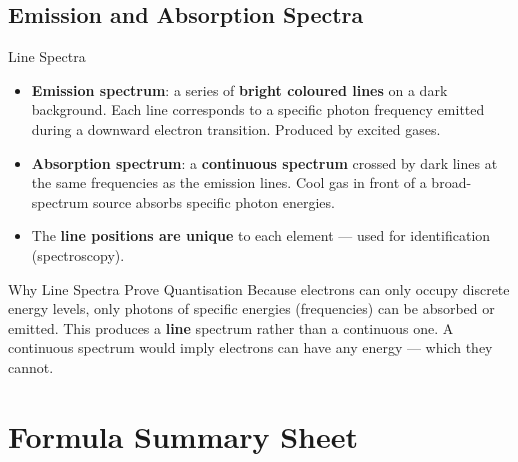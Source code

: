 \subsection{Emission and Absorption Spectra}

\begin{definitionbox}{Line Spectra}
\begin{itemize}[itemsep=4pt]
  \item \textbf{Emission spectrum}: a series of \textbf{bright coloured lines} on a dark background. Each line corresponds to a specific photon frequency emitted during a downward electron transition. Produced by excited gases.
  \item \textbf{Absorption spectrum}: a \textbf{continuous spectrum} crossed by dark lines at the same frequencies as the emission lines. Cool gas in front of a broad-spectrum source absorbs specific photon energies.
  \item The \textbf{line positions are unique} to each element — used for identification (spectroscopy).
\end{itemize}
\end{definitionbox}

\begin{keybox}{Why Line Spectra Prove Quantisation}
Because electrons can only occupy discrete energy levels, only photons of specific energies (frequencies) can be absorbed or emitted. This produces a \textbf{line} spectrum rather than a continuous one. A continuous spectrum would imply electrons can have any energy — which they cannot.
\end{keybox}

\section{Formula Summary Sheet}

